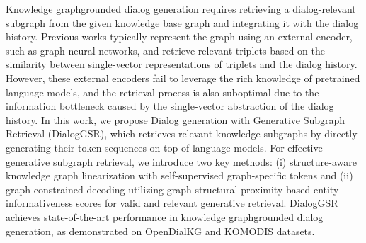 Knowledge graph{\textendash}grounded dialog generation requires retrieving a dialog-relevant subgraph from the given knowledge base graph and integrating it with the dialog history.
Previous works typically represent the graph using an external encoder, such as graph neural networks, and retrieve relevant triplets based on the similarity between single-vector representations of triplets and the dialog history. 
However, these external encoders fail to leverage the rich knowledge of pretrained language models, and the retrieval process is also suboptimal due to the information bottleneck caused by the single-vector abstraction of the dialog history.
In this work, we propose Dialog generation with Generative Subgraph Retrieval (DialogGSR), which retrieves relevant knowledge subgraphs by directly generating their token sequences on top of language models. 
For effective generative subgraph retrieval, we introduce two key methods: (i) structure-aware knowledge graph linearization with self-supervised graph-specific tokens and (ii) graph-constrained decoding utilizing graph structural proximity-based entity informativeness scores for valid and relevant generative retrieval. 
DialogGSR achieves state-of-the-art performance in knowledge graph{\textendash}grounded dialog generation, as demonstrated on OpenDialKG and KOMODIS datasets.

